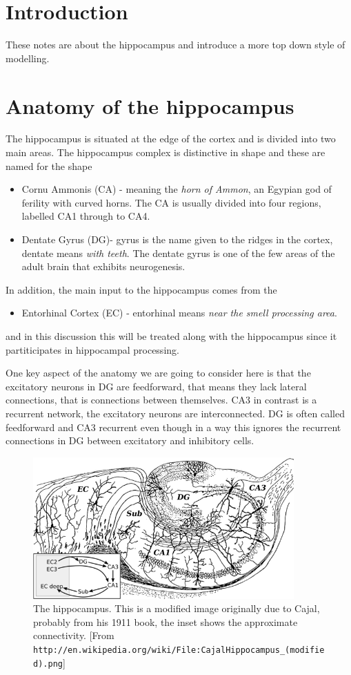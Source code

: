 \documentclass[11pt,a4paper]{scrartcl}
\begin{document}
\section*{Introduction}
These notes are about the hippocampus and introduce a more top down
style of modelling.

\section*{Anatomy of the hippocampus}

The hippocampus is situated at the edge of the cortex and is divided
into two main areas. The hippocampus complex is distinctive in shape
and these are named for the shape
\begin{itemize}
\item Cornu Ammonis (CA) - meaning the \textsl{horn of Ammon}, an
  Egypian god of ferility with curved horns. The CA is usually divided
  into four regions, labelled CA1 through to CA4.
\item Dentate Gyrus (DG)- gyrus is the name given to the ridges in the
  cortex, dentate means \textsl{with teeth}. The dentate gyrus is one
  of the few areas of the adult brain that exhibits neurogenesis.
\end{itemize}
In addition, the main input to the hippocampus comes from the
\begin{itemize}
\item Entorhinal Cortex (EC) - entorhinal means \textsl{near the smell processing area}. 
\end{itemize}
and in this discussion this will be treated along with the hippocampus
since it partiticipates in hippocampal processing.

One key aspect of the anatomy we are going to consider here is that
the excitatory neurons in DG are feedforward, that means they lack
lateral connections, that is connections between themselves. CA3 in
contrast is a recurrent network, the excitatory neurons are
interconnected. DG is often called feedforward and CA3 recurrent even
though in a way this ignores the recurrent connections in DG between
excitatory and inhibitory cells.

\begin{figure}
\begin{center}
\includegraphics[width=10cm]{640px:CajalHippocampus_(modified).png}
\end{center}
\caption{The hippocampus. This is a modified image originally due to
  Cajal, probably from his 1911 book, the inset shows the approximate
  connectivity. [From
    \texttt{http://en.wikipedia.org/wiki/File:CajalHippocampus\_(modified).png}]\label{fig:hippocampus}}
\end{figure}
\end{document}
